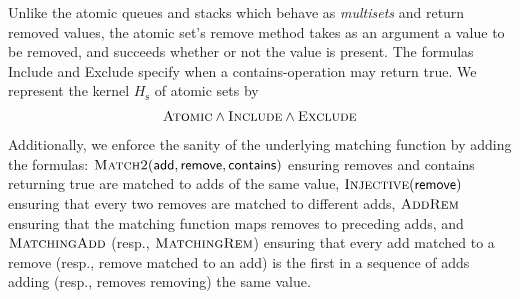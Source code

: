 \begin{example}

  Unlike the atomic queues and stacks which behave as \emph{multisets} and
  return removed values, the atomic set’s remove method takes as an
  argument a value to be removed, and succeeds whether or not the value is
  present. The formulas {\sc Include} and {\sc Exclude} specify when a 
  contains-operation may return true. We represent the kernel $H_\mathrm{s}$
  of atomic sets by  
  \begin{align*}
    \textsc{Atomic} \land \textsc{Include} \land \textsc{Exclude}
  \end{align*}
  Additionally, we enforce the sanity of the underlying matching function by
  adding the formulas: $\textsc{Match2}({\sf add},{\sf
  remove},{\sf contains})$ ensuring removes and contains returning true
  are matched to adds of the same value, $\textsc{Injective}({\sf remove})$ 
  ensuring that every two removes are matched to different adds,
  $\textsc{AddRem}$ ensuring that the matching function maps removes to preceding
  adds, and 
  $\textsc{MatchingAdd}$ (resp., $\textsc{MatchingRem}$) ensuring that every add matched to a remove
  (resp., remove matched to an add) is the first in a sequence of adds adding 
  (resp., removes removing) the same value.

\end{example}

